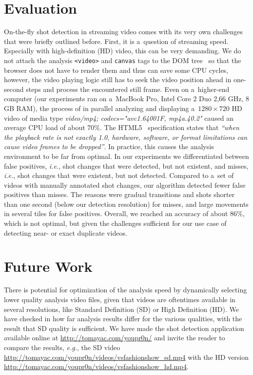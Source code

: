\section{Evaluation}

On-the-fly shot detection in streaming video
comes with its very own challenges that were briefly outlined before.
First, it is a~question of streaming speed.
Especially with high-definition (HD) video,
this can be very demanding.
We do not attach the analysis \texttt{<video>} and \texttt{canvas} tags
to the DOM tree~\cite{lehors2004dom} so that the browser
does not have to render them and thus can save some CPU cycles,
however, the video playing logic still has to seek the video position
ahead in one-second steps and process the encountered still frame.
Even on a~higher-end computer (our experiments ran on a~MacBook
Pro, Intel Core 2 Duo 2,66 GHz, 8 GB RAM),
the process of in parallel analyzing and displaying
a~$\mathit{1280} \times \mathit{720}$ HD video of media type
\emph{video/mp4; codecs="avc1.64001F, mp4a.40.2"}
caused an average CPU load of about 70\%.
The HTML5~\cite{berjon2012html5} specification states that
\textit{``when the playback rate is not exactly 1.0,
hardware, software, or format limitations can cause video frames
to be dropped''}.
In practice, this causes the analysis environment
to be far from optimal.
In our experiments we differentiated between false positives,
\emph{i.e.}, shot changes that were detected,
but not existent, and misses, \emph{i.e.},
shot changes that were existent,
but not detected.
Compared to a~set of videos with manually annotated shot changes,
our algorithm detected fewer false positives than misses.
The reasons were gradual transitions and shots
shorter than one second (below our detection resolution)
for misses, and large movements in several tiles
for false positives.
Overall, we reached an accuracy of about 86\%,
which is not optimal, but given the challenges
sufficient for our use case of
detecting near- or exact duplicate videos. 

\section{Future Work}

There is potential for optimization of the analysis speed
by dynamically selecting lower quality analysis video files,
given that videos are oftentimes available in several resolutions,
like Standard Definition (SD) or High Definition (HD).
We have checked in how far analysis results differ
for the various qualities,
with the result that SD quality is sufficient.
We have made the shot detection application available online at
\url{http://tomayac.com/youpr0n/} and invite the reader to compare
the results, \emph{e.g.}, the SD video
\url{http://tomayac.com/youpr0n/videos/vsfashionshow_sd.mp4} with
the HD version \url{http://tomayac.com/youpr0n/videos/vsfashionshow_hd.mp4}.

